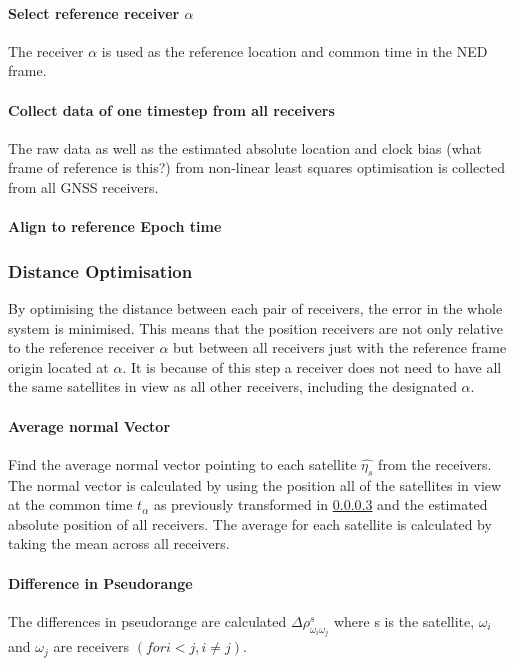 \paragraph{Select reference receiver $\alpha$}
The receiver $\alpha$ is used as the reference location and common time in the NED frame. 
\paragraph{Collect data of one timestep from all receivers}
The raw data as well as the estimated absolute location and clock bias (what frame of reference is this?) from non-linear least squares optimisation is collected from all GNSS receivers.
\paragraph{Align to reference Epoch time}\label{timetransform}


\subsubsection{Distance Optimisation}
By optimising the distance between each pair of receivers, the error in the whole system is minimised. 
This means that the position receivers are not only relative to the reference receiver $\alpha$ but between all receivers just with the reference frame origin located at $\alpha$. It is because of this step a receiver does not need to have all the same satellites in view as all other receivers, including the designated $\alpha$.


\paragraph{Average normal Vector}
Find the average normal vector pointing to each satellite $\hat{\eta_s}$ from the receivers. The normal vector is calculated by using the position all of the satellites in view at the common time $t_{\alpha}$ as previously transformed in \ref{timetransform} and the estimated absolute position of all receivers. The average for each satellite is calculated by taking the mean across all receivers.

\paragraph{Difference in Pseudorange}
The differences in pseudorange are calculated $\Delta\rho^s_{\omega_i\omega_j}$ where s is the satellite, $\omega_i$ and $\omega_j$ are receivers $(for i<j, i\neq j)$. 

